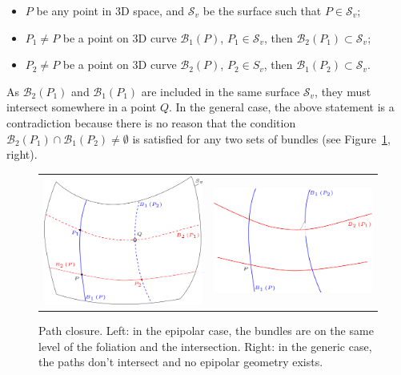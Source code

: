 \documentclass{ipol}
\newcommand{\Bund}[1]{\ensuremath{\mathcal{B}_{#1}}}
\newcommand{\BundO}{\Bund{1}}
\newcommand{\BundT}{\Bund{2}}
\newcommand{\Sv}{\ensuremath{\mathcal{S}_{v}}}
\begin{document}
\begin{itemize}
   \item   $P$ be any point in $3$D space, and $\Sv$ be the surface such that $P \in \Sv$;
   \item   $P_1 \neq P$ be a point on 3D curve $\BundO(P)$, $P_1 \in \Sv$, then $\BundT(P_1) \subset \Sv$;
   \item   $P_2 \neq P$ be a point on 3D curve $\BundT(P)$, $P_2 \in S_v$, then $\BundO(P_2) \subset \Sv$.
\end{itemize}
As $\BundT(P_1)$ and $\BundO(P_1)$ are included in the same surface $\Sv$, they
            must intersect somewhere in a point $Q$.
In the general case, the above statement is a contradiction because  there is no reason that the condition $\BundT(P_1) \cap \BundO(P_2) \neq \emptyset $ is satisfied for any two sets
of bundles (see Figure~\ref{FigClothPath}, right).

\begin{figure}[h!]
\centering
\begin{tabular}{cc}
\includegraphics[width=7cm]{FIGS/ClothPathEpip.png} &
\includegraphics[width=7cm]{FIGS/ClothPathNonEpip.png}\\
\end{tabular}
\caption{Path closure. Left: in the epipolar case, the bundles are on the same level of the foliation and the intersection.
Right: in the generic case, the paths don't intersect and no epipolar geometry exists.}
\label{FigClothPath}
\end{figure}
\end{document}
